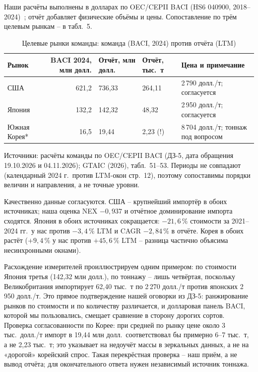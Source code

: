 \documentclass[11pt,a4paper]{article}
\begin{document}
Наши расчёты выполнены в долларах по OEC/CEPII BACI (HS6 040900, 2018--2024)~\cite{oecbaci};
отчёт добавляет физические объёмы и цены. Сопоставление по трём целевым рынкам -- в табл.~5.

\begin{table}[h]
\centering
\small
\caption{Целевые рынки команды: команда (BACI, 2024) против отчёта (LTM)}
\begin{tabular}{lrllp{4.6cm}}
\toprule
Рынок & BACI 2024, млн долл. & Отчёт, млн долл. & Отчёт, тыс.~т & Цена и примечание \\
\midrule
США & 621{,}2 & 736{,}33 & 264{,}11 & 2\,790 долл./т; согласуется \\
Япония & 132{,}2 & 142{,}32 & 48{,}32 & 2\,950 долл./т; согласуется \\
Южная Корея* & 16{,}5 & 19{,}44 & 2{,}23 (!) & 8\,704 долл./т; тоннаж под вопросом \\
\bottomrule
\end{tabular}

\noindent Источники: расчёты команды по OEC/CEPII BACI (ДЗ-5, дата обращения 19.10.2026
и 04.11.2026); GTAIC (2026), табл.~51--53. Периоды не совпадают (календарный 2024 г.\ против
LTM-окон стр.~12), поэтому сопоставимы порядки величин и направления, а не точные уровни.
\end{table}

Качественно данные согласуются. США -- крупнейший импортёр в обоих источниках; наша оценка
NEX $-0{,}937$ и отчётное доминирование импорта сходятся. Япония в обоих источниках
сокращается: $-21{,}6\,\%$ стоимости за 2021--2024 гг.\ у нас против $-3{,}4\,\%$ LTM и CAGR
$-2{,}84\,\%$ в отчёте. Корея в обоих растёт ($+9{,}4\,\%$ у нас против $+45{,}6\,\%$ LTM --
разница частично объясима несинхронными окнами).

Расхождение измерителей проиллюстрируем одним примером: по стоимости Япония третья
(142{,}32 млн долл.), по тоннажу -- лишь четвёртая, поскольку Великобритания импортирует
62{,}40 тыс.~т по 2\,270 долл./т против японских 2\,950 долл./т. Это прямое подтверждение
нашей оговорки из ДЗ-5: ранжирование рынков по стоимости и по количеству различается, и
долларовая панель BACI, которой мы пользовались, смещает сравнение в сторону дорогих сортов.
Проверка согласованности по Корее: при средней по рынку цене около 3 тыс.\ долл./т импорт
в 19{,}44 млн долл.\ соответствовал бы примерно 6--7 тыс.~т, а не 2{,}23 тыс.~т; это указывает
на недоучёт массы в зеркальных данных, а не на «дорогой» корейский спрос. Такая перекрёстная
проверка -- наш приём, а не вывод отчёта; для окончательного ответа нужен независимый источник
тоннажа.
\end{document}
